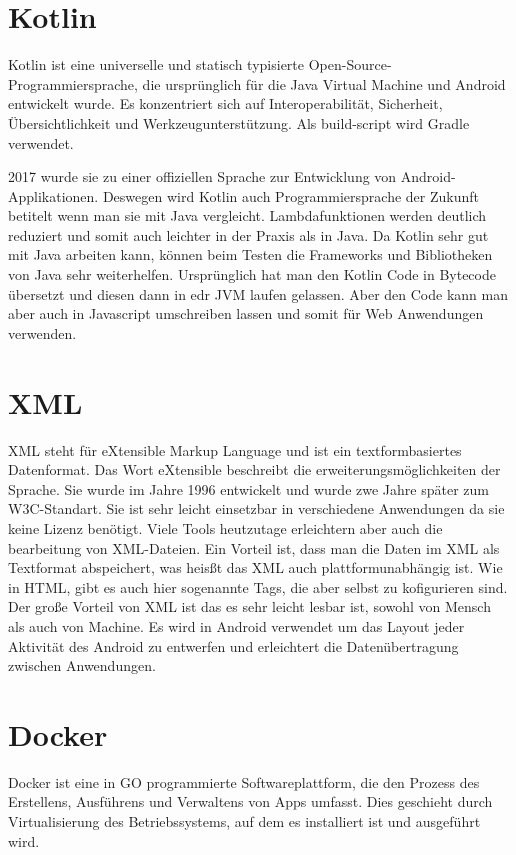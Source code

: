 \section{Kotlin}
\cite{Kotlin1}
\cite{Kotlin2}
\author{Bozidar Spasenovic}
Kotlin ist eine universelle und statisch typisierte Open-Source-Programmiersprache, die ursprünglich für die Java Virtual Machine und Android entwickelt wurde.
Es konzentriert sich auf Interoperabilität, Sicherheit, Übersichtlichkeit und Werkzeugunterstützung. Als build-script wird Gradle verwendet.

2017 wurde sie zu einer offiziellen Sprache zur Entwicklung von Android-Applikationen. Deswegen wird Kotlin auch Programmiersprache der Zukunft betitelt wenn man sie mit Java vergleicht.
Lambdafunktionen werden deutlich reduziert und somit auch leichter in der Praxis als in Java. 
Da Kotlin sehr gut mit Java arbeiten kann, können beim Testen die Frameworks und Bibliotheken von Java sehr weiterhelfen.  
Ursprünglich hat man den Kotlin Code in Bytecode übersetzt und diesen dann in edr JVM laufen gelassen. 
Aber den Code kann man aber auch in Javascript umschreiben lassen und somit für Web Anwendungen verwenden.

\section{XML}
\cite{XML1}
\cite{XML2}
\author{Bozidar Spasenovic}
XML steht für eXtensible Markup Language und ist ein textformbasiertes Datenformat.
Das Wort eXtensible beschreibt die erweiterungsmöglichkeiten der Sprache.
Sie wurde im Jahre 1996 entwickelt und wurde zwe Jahre später zum W3C-Standart. 
Sie ist sehr leicht einsetzbar in verschiedene Anwendungen da sie keine Lizenz benötigt.
Viele Tools heutzutage erleichtern aber auch die bearbeitung von XML-Dateien.
Ein Vorteil ist, dass man die Daten im XML als Textformat abspeichert, was heisßt das XML auch plattformunabhängig ist.
Wie in HTML, gibt es auch hier sogenannte Tags, die aber selbst zu kofigurieren sind. 
Der große Vorteil von XML ist das es sehr leicht lesbar ist, sowohl von Mensch als auch von Machine.
Es wird in Android verwendet um das Layout jeder Aktivität des Android zu entwerfen und erleichtert die Datenübertragung zwischen Anwendungen.




\section{Docker}
\author{Bozidar Spasenovic}
Docker ist eine in GO programmierte Softwareplattform, die den Prozess des Erstellens, Ausführens und Verwaltens von Apps umfasst.
Dies geschieht durch Virtualisierung des Betriebssystems, auf dem es installiert ist und ausgeführt wird. 
